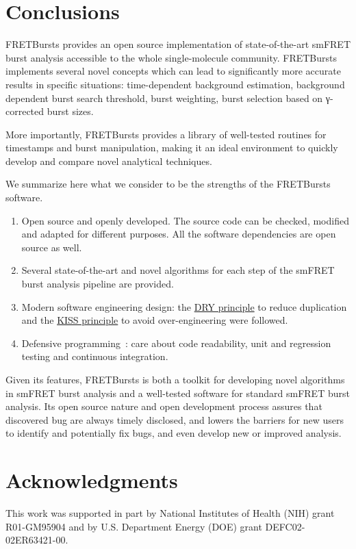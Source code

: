 \section{Conclusions}
\label{sec:conclusions}

FRETBursts provides an open source implementation of state-of-the-art smFRET burst analysis 
accessible to the whole single-molecule community.
FRETBursts implements several novel concepts which can lead 
to significantly more accurate results in specific situations:
time-dependent background estimation, background dependent burst search threshold,
burst weighting, burst selection based on γ-corrected burst sizes.

More importantly, FRETBursts provides a library of well-tested routines
for timestamps and burst manipulation, making it an ideal environment to 
quickly develop and compare novel analytical techniques.

We summarize here what we consider to be the strengths
of the FRETBursts software.

\begin{enumerate}
\item Open source and openly developed. The source code can be checked, modified and
adapted for different purposes. All the software dependencies are open source as well.
\item Several state-of-the-art and novel algorithms for each step of the
smFRET burst analysis pipeline are provided.
\item Modern software engineering design: the
\href{http://en.wikipedia.org/wiki/Don\%27t_repeat_yourself}{DRY principle}
to reduce duplication and the
\href{http://en.wikipedia.org/wiki/KISS_principle}{KISS principle}
to avoid over-engineering were followed.
\item Defensive programming~\cite{Prli__2012}: care about code readability,
unit and regression testing and continuous integration.
\end{enumerate}

Given its features, FRETBursts is both a toolkit for developing novel algorithms
in smFRET burst analysis and a well-tested software for standard smFRET burst analysis. 
Its open source nature and open development process assures that discovered bug 
are always timely disclosed, and lowers the barriers
for new users to identify and potentially fix bugs, and even develop new or improved analysis.

\section*{Acknowledgments}
This work was supported in part by National Institutes of Health (NIH)
grant R01-GM95904 and by U.S. Department Energy (DOE) grant DEFC02-02ER63421-00.
